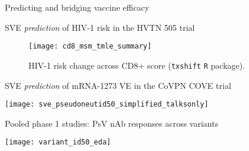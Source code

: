 \documentclass{beamer}
\begin{document}

\begin{frame}[standout]
  Predicting and bridging vaccine efficacy
\end{frame}


\begin{frame}[c]{SVE \textit{prediction} of HIV-1 risk in the HVTN 505 trial}

\vspace{-0.3in}
\begin{figure}[H]
  \centering
  \texttt{[image: cd8\_msm\_tmle\_summary]}
  \captionsetup{labelformat=empty}
  \vspace{-1.5em}
  \caption{
    HIV-1 risk change across CD8+ score (\texttt{txshift} \texttt{R}
    package).
  }
\end{figure}

\note{
}

\end{frame}


\begin{frame}[c]{SVE \textit{prediction} of mRNA-1273 VE in the CoVPN COVE
trial}

\vspace*{-0.1cm}
\hspace*{-0.5cm}\texttt{[image: sve\_pseudoneutid50\_simplified\_talksonly]}

\note{
}

\end{frame}


\begin{frame}[c]{Pooled phase 1 studies: PsV nAb responses across variants}

\vspace*{0.2cm}
\hspace*{-0.8cm}\texttt{[image: variant\_id50\_eda]}

\note{
}

\end{frame}

\end{document}
